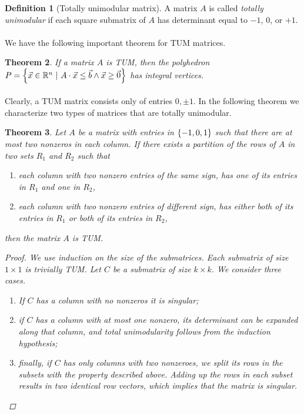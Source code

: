 \documentclass[titlepage]{book}
\theoremstyle{plain}
\newtheorem{theorem}{Theorem}[chapter]
\theoremstyle{definition}
\newtheorem{definition}[theorem]{Definition}
\theoremstyle{remark}
\begin{document}
\begin{definition}[Totally unimodular matrix]
A matrix $A$ is called \emph{totally unimodular} if each square submatrix of $A$ has determinant equal to $-1$, $0$, or $+1$.
\end{definition}

\paragraph{}
We have the following important theorem for TUM matrices.

\begin{theorem}
If a matrix $A$ is TUM, then the polyhedron $P=\left\{ \vec{x}\in\mathbb{R}^n\ |\ A\cdot\vec{x}\leq\vec{b}\wedge\vec{x}\geq\vec{0} \right\}$ has integral vertices.
\end{theorem}

\paragraph{}
Clearly, a TUM matrix consists only of entries $0,\pm 1$. In the following theorem we characterize two types of matrices that are totally unimodular.
\begin{theorem}
Let $A$ be a matrix with entries in $\left\{ -1, 0, 1 \right\}$ such that there are at most two nonzeros in each column. If there exists a partition of the rows of $A$ in two sets $R_1$ and $R_2$ such that
\begin{enumerate}
 \item each column with two nonzero entries of the same sign, has one of its entries in $R_1$ and one in $R_2$,
 \item each column with two nonzero entries of different sign, has either both of its entries in $R_1$ or both of its entries in $R_2$,
\end{enumerate}
then the matrix $A$ is TUM.
\begin{proof}
We use induction on the size of the submatrices. Each submatrix of size $1\times 1$ is trivially TUM. Let $C$ be a submatrix of size $k\times k$. We consider three cases.
\begin{enumerate}
 \item If $C$ has a column with no nonzeros it is singular;
 \item if $C$ has a column with at most one nonzero, its determinant can be expanded along that column, and total unimodularity follows from the induction hypothesis;
 \item finally, if $C$ has only columns with two nonzeroes, we split its rows in the subsets with the property described above. Adding up the rows in each subset results in two identical row vectors, which implies that the matrix is singular.
\end{enumerate}
\end{proof}
\end{theorem}
\end{document}

